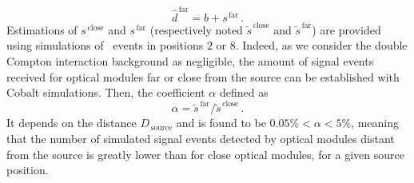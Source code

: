 \begin{equation}
  \hat{d}^{\,\text{far}} = b + s^{\,\text{far}}\,.
  \label{eq:estimation_data_far}
\end{equation}
Estimations of $s^{\,\text{close}}$ and $s^{\,\text{far}}$ (respectively noted $\tilde{s}^{\,\text{close}}$ and $\tilde{s}^{\,\text{far}}$) are provided using simulations of \Co\ events in positions $2$ or $8$.
Indeed, as we consider the double Compton interaction background as negligible, the amount of signal events received for optical modules far or close from the source can be established with Cobalt simulations.
Then, the coefficient $\alpha$ defined as
\begin{equation}
  \alpha = \tilde{s}^{\,\text{far}}/\tilde{s}^{\,\text{close}}\,.
\end{equation}
It depends on the distance $D_{\,\text{source}}$ and is found to be $0.05 \% < \alpha < 5 \%$, meaning that the number of simulated signal events detected by optical modules distant from the source is greatly lower than for close optical modules, for a given source position.

